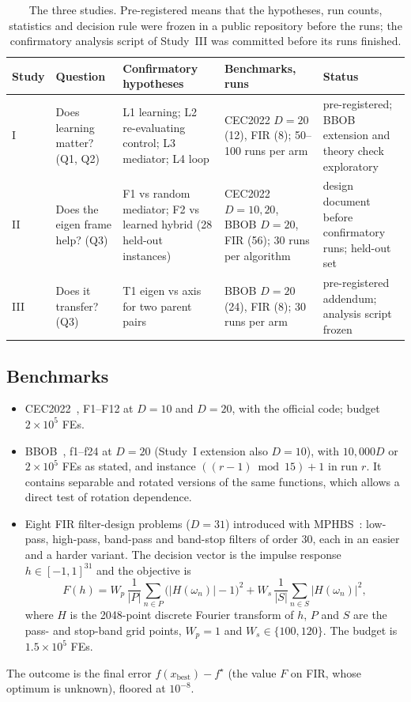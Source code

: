 \begin{table}[!htbp]
\centering
\caption{The three studies. Pre-registered means that the hypotheses, run counts, statistics and decision rule were frozen
in a public repository before the runs; the confirmatory analysis script of Study~III was committed before its runs
finished.}
\label{tab:studies}
\footnotesize
\begin{tabular}{p{0.8cm}p{3.1cm}p{3.4cm}p{3.3cm}p{2.6cm}}
\toprule
Study & Question & Confirmatory hypotheses & Benchmarks, runs & Status \\
\midrule
I & Does learning matter? (Q1, Q2) & L1 learning; L2 re-evaluating control; L3 mediator; L4 loop & CEC2022 $D=20$ (12), FIR (8); 50--100 runs per arm & pre-registered; BBOB extension and theory check exploratory \\
II & Does the eigen frame help? (Q3) & F1 vs random mediator; F2 vs learned hybrid (28 held-out instances) & CEC2022 $D=10,20$, BBOB $D=20$, FIR (56); 30 runs per algorithm & design document before confirmatory runs; held-out set \\
III & Does it transfer? (Q3) & T1 eigen vs axis for two parent pairs & BBOB $D=20$ (24), FIR (8); 30 runs per arm & pre-registered addendum; analysis script frozen \\
\bottomrule
\end{tabular}
\end{table}

\subsection{Benchmarks}
\begin{itemize}
\item CEC2022~\citep{kumar2021cec2022}, F1--F12 at $D=10$ and $D=20$, with the official code; budget $2\times10^5$ FEs.
\item BBOB~\citep{hansen2009bbob}, f1--f24 at $D=20$ (Study~I extension also $D=10$), with $10{,}000D$ or $2\times10^5$ FEs as
stated, and instance $((r-1)\bmod 15)+1$ in run $r$. It contains separable and rotated versions of the same functions, which
allows a direct test of rotation dependence.
\item Eight FIR filter-design problems ($D=31$) introduced with MPHBS~\citep{flores2026mphbs}: low-pass, high-pass,
band-pass and band-stop filters of order 30, each in an easier and a harder variant. The decision vector is the impulse
response $h\in[-1,1]^{31}$ and the objective is
\begin{equation}
F(h) = W_p\,\frac{1}{|P|}\sum_{n\in P}\bigl(|H(\omega_n)|-1\bigr)^2 + W_s\,\frac{1}{|S|}\sum_{n\in S}|H(\omega_n)|^2,
\label{eq:fir}
\end{equation}
where $H$ is the 2048-point discrete Fourier transform of $h$, $P$ and $S$ are the pass- and stop-band grid points, $W_p=1$
and $W_s\in\{100,120\}$. The budget is $1.5\times10^5$ FEs.
\end{itemize}
The outcome is the final error $f(x_\mathrm{best})-f^\star$ (the value $F$ on FIR, whose optimum is unknown), floored at
$10^{-8}$.

